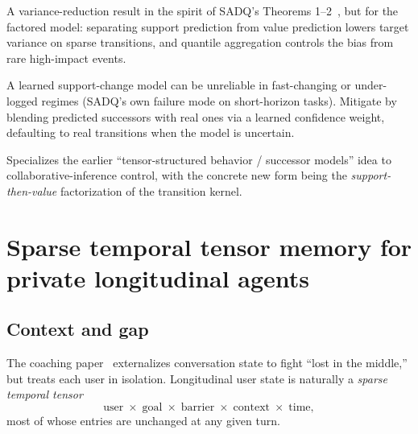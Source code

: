 \documentclass[11pt]{article}
\begin{document}
\begin{theorybox}
A variance-reduction result in the spirit of SADQ's Theorems 1--2~\cite{sadq}, but for the
factored model: separating support prediction from value prediction lowers target variance
on sparse transitions, and quantile aggregation controls the bias from rare high-impact
events.
\end{theorybox}

\begin{riskbox}
A learned support-change model can be unreliable in fast-changing or under-logged regimes
(SADQ's own failure mode on short-horizon tasks). Mitigate by blending predicted successors
with real ones via a learned confidence weight, defaulting to real transitions when the
model is uncertain.
\end{riskbox}

\begin{buildbox}
Specializes the earlier ``tensor-structured behavior / successor models'' idea to
collaborative-inference control, with the concrete new form being the \emph{support-then-value}
factorization of the transition kernel.
\end{buildbox}

\section{Sparse temporal tensor memory for private longitudinal agents}
\label{sec:memory}

\subsection*{Context and gap}
The coaching paper~\cite{coaching} externalizes conversation state to fight ``lost in the
middle,'' but treats each user in isolation. Longitudinal user state is naturally a
\emph{sparse temporal tensor}
\[
\text{user}\;\times\;\text{goal}\;\times\;\text{barrier}\;\times\;\text{context}\;\times\;\text{time},
\]
most of whose entries are unchanged at any given turn.
\end{document}
